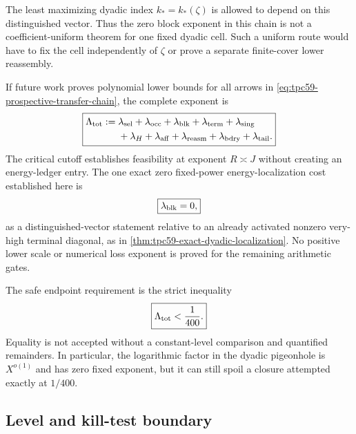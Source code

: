 The least maximizing dyadic index \(k_*=k_*(\zeta)\) is allowed to depend
on this distinguished vector.  Thus the zero block exponent in this chain
is not a coefficient-uniform theorem for one fixed dyadic cell.  Such a
uniform route would have to fix the cell independently of \(\zeta\) or
prove a separate finite-cover lower reassembly.

If future work proves polynomial lower bounds for all arrows in
\eqref{eq:tpc59-prospective-transfer-chain}, the complete exponent is
\begin{equation}
 \boxed{
 \begin{aligned}
 \Lambda_{\rm tot}:={}&
 \lambda_{\rm sel}+\lambda_{\rm occ}
 +\lambda_{\rm blk}
 +\lambda_{\rm term}+\lambda_{\rm sing}\\
 &+\lambda_H+\lambda_{\rm aff}
 +\lambda_{\rm reasm}
 +\lambda_{\rm bdry}+\lambda_{\rm tail}.
 \end{aligned}}
 \label{eq:tpc59-complete-loss-ledger}
\end{equation}
The critical cutoff establishes feasibility at exponent \(R\asymp J\)
without creating an energy-ledger entry.  The one exact zero fixed-power
energy-localization cost established here is
\begin{equation}
 \boxed{\lambda_{\rm blk}=0,}
 \label{eq:tpc59-zero-block-loss}
\end{equation}
as a distinguished-vector statement relative to an already activated
nonzero very-high terminal diagonal, as in
\cref{thm:tpc59-exact-dyadic-localization}.  No positive lower scale or
numerical loss exponent is proved for the remaining arithmetic gates.

The safe endpoint requirement is the strict inequality
\begin{equation}
 \boxed{\Lambda_{\rm tot}<\frac1{400}.}
 \label{eq:tpc59-strict-endpoint-ledger}
\end{equation}
Equality is not accepted without a constant-level comparison and quantified
remainders.  In particular, the logarithmic factor in the dyadic
pigeonhole is \(X^{o(1)}\) and has zero fixed exponent, but it can still
spoil a closure attempted exactly at \(1/400\).

\subsection{Level and kill-test boundary}

